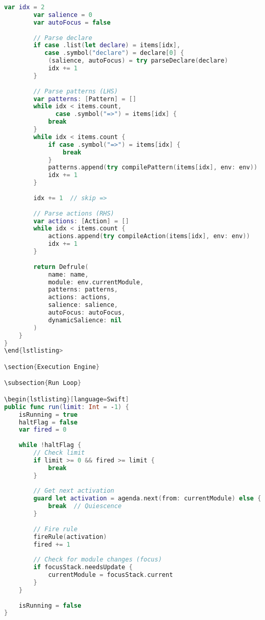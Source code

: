 \begin{lstlisting}[language=Swift]
        var idx = 2
        var salience = 0
        var autoFocus = false
        
        // Parse declare
        if case .list(let declare) = items[idx],
           case .symbol("declare") = declare[0] {
            (salience, autoFocus) = try parseDeclare(declare)
            idx += 1
        }
        
        // Parse patterns (LHS)
        var patterns: [Pattern] = []
        while idx < items.count, 
              case .symbol("=>") = items[idx] {
            break
        }
        while idx < items.count {
            if case .symbol("=>") = items[idx] {
                break
            }
            patterns.append(try compilePattern(items[idx], env: env))
            idx += 1
        }
        
        idx += 1  // skip =>
        
        // Parse actions (RHS)
        var actions: [Action] = []
        while idx < items.count {
            actions.append(try compileAction(items[idx], env: env))
            idx += 1
        }
        
        return Defrule(
            name: name,
            module: env.currentModule,
            patterns: patterns,
            actions: actions,
            salience: salience,
            autoFocus: autoFocus,
            dynamicSalience: nil
        )
    }
}
\end{lstlisting>

\section{Execution Engine}

\subsection{Run Loop}

\begin{lstlisting}[language=Swift]
public func run(limit: Int = -1) {
    isRunning = true
    haltFlag = false
    var fired = 0
    
    while !haltFlag {
        // Check limit
        if limit >= 0 && fired >= limit {
            break
        }
        
        // Get next activation
        guard let activation = agenda.next(from: currentModule) else {
            break  // Quiescence
        }
        
        // Fire rule
        fireRule(activation)
        fired += 1
        
        // Check for module changes (focus)
        if focusStack.needsUpdate {
            currentModule = focusStack.current
        }
    }
    
    isRunning = false
}
\end{lstlisting}

